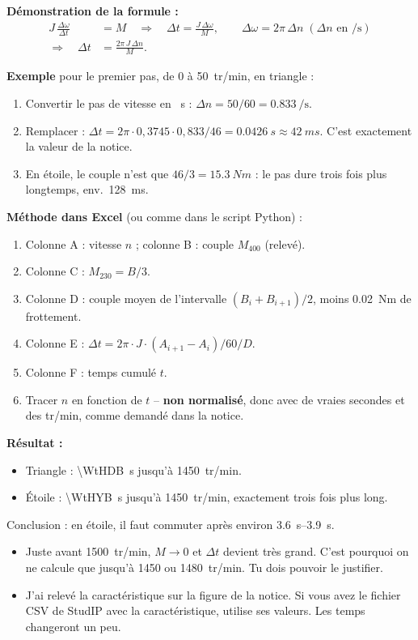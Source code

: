 \documentclass[11pt,a4paper]{article}
\begin{document}
\textbf{Démonstration de la formule :}
\begin{align*}
J\,\frac{\Delta\omega}{\Delta t} &= M
\quad\Rightarrow\quad \Delta t = \frac{J\,\Delta\omega}{M},
\qquad \Delta\omega = 2\pi\,\Delta n\;(\Delta n \text{ en } \si{\per\second})\\
\Rightarrow\quad \Delta t &= \frac{2\pi\,J\,\Delta n}{M}.
\end{align*}

\textbf{Exemple} pour le premier pas, de 0 à \SI{50}{tr/min}, en triangle :
\begin{enumerate}
\item Convertir le pas de vitesse en \si{\per\second} : $\Delta n = 50/60 = \SI{0,833}{\per\second}$.
\item Remplacer : $\Delta t = 2\pi\cdot0{,}3745\cdot0{,}833/46 = \SI{0,0426}{s}\approx\SI{42}{ms}$.
      C'est exactement la valeur de la notice.
\item En étoile, le couple n'est que $46/3 = \SI{15,3}{Nm}$ : le pas dure trois fois plus
      longtemps, env.\ \SI{128}{ms}.
\end{enumerate}

\textbf{Méthode dans Excel} (ou comme dans le script Python) :
\begin{enumerate}
\item Colonne A : vitesse $n$ ; colonne B : couple $M_{400}$ (relevé).
\item Colonne C : $M_{230} = B/3$.
\item Colonne D : couple moyen de l'intervalle $(B_i+B_{i+1})/2$, moins \SI{0,02}{Nm} de frottement.
\item Colonne E : $\Delta t = 2\pi\cdot J\cdot(A_{i+1}-A_i)/60/D$.
\item Colonne F : temps cumulé $t$.
\item Tracer $n$ en fonction de $t$ -- \textbf{non normalisé}, donc avec de vraies secondes et
      des tr/min, comme demandé dans la notice.
\end{enumerate}

\textbf{Résultat :}
\begin{itemize}
\item Triangle : \SI{\WtHDB}{s} jusqu'à \SI{1450}{tr/min}.
\item Étoile : \SI{\WtHYB}{s} jusqu'à \SI{1450}{tr/min}, exactement trois fois plus long.
\end{itemize}
Conclusion : en étoile, il faut commuter après environ \SIrange{3,6}{3,9}{s}.

\begin{achtung}
\begin{itemize}
\item Juste avant \SI{1500}{tr/min}, $M\to0$ et $\Delta t$ devient très grand. C'est pourquoi on
      ne calcule que jusqu'à \SI{1450}{} ou \SI{1480}{tr/min}. Tu dois pouvoir le justifier.
\item J'ai relevé la caractéristique sur la figure de la notice. Si vous avez le fichier CSV de
      StudIP avec la caractéristique, utilise ses valeurs. Les temps changeront un peu.
\end{itemize}
\end{achtung}
\end{document}

